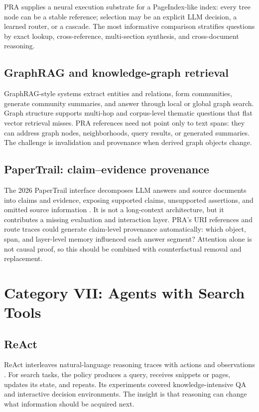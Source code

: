 \documentclass[10pt,a4paper]{article}
\begin{document}
PRA supplies a neural execution substrate for a PageIndex-like index: every tree node can be a stable reference; selection may be an explicit LLM decision, a learned router, or a cascade. The most informative comparison stratifies questions by exact lookup, cross-reference, multi-section synthesis, and cross-document reasoning.

\subsection{GraphRAG and knowledge-graph retrieval}
GraphRAG-style systems extract entities and relations, form communities, generate community summaries, and answer through local or global graph search. Graph structure supports multi-hop and corpus-level thematic questions that flat vector retrieval misses. PRA references need not point only to text spans: they can address graph nodes, neighborhoods, query results, or generated summaries. The challenge is invalidation and provenance when derived graph objects change.

\subsection{PaperTrail: claim--evidence provenance}
The 2026 PaperTrail interface decomposes LLM answers and source documents into claims and evidence, exposing supported claims, unsupported assertions, and omitted source information \citep{martinboyle2026papertrail}. It is not a long-context architecture, but it contributes a missing evaluation and interaction layer. PRA's URI references and route traces could generate claim-level provenance automatically: which object, span, and layer-level memory influenced each answer segment? Attention alone is not causal proof, so this should be combined with counterfactual removal and replacement.

\section{Category VII: Agents with Search Tools}
\subsection{ReAct}
ReAct interleaves natural-language reasoning traces with actions and observations \citep{yao2023react}. For search tasks, the policy produces a query, receives snippets or pages, updates its state, and repeats. Its experiments covered knowledge-intensive QA and interactive decision environments. The insight is that reasoning can change what information should be acquired next.
\end{document}
